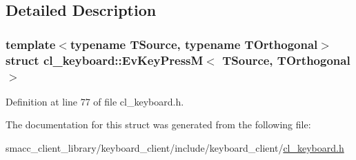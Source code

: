 \subsection{Detailed Description}
\subsubsection*{template$<$typename T\+Source, typename T\+Orthogonal$>$\newline
struct cl\+\_\+keyboard\+::\+Ev\+Key\+Press\+M$<$ T\+Source, T\+Orthogonal $>$}



Definition at line 77 of file cl\+\_\+keyboard.\+h.



The documentation for this struct was generated from the following file\+:\begin{DoxyCompactItemize}
\item 
smacc\+\_\+client\+\_\+library/keyboard\+\_\+client/include/keyboard\+\_\+client/\hyperlink{cl__keyboard_8h}{cl\+\_\+keyboard.\+h}\end{DoxyCompactItemize}
